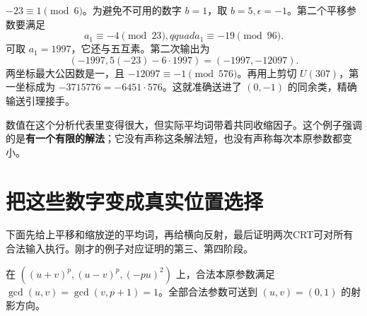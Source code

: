 $-23\equiv1\pmod6$。为避免不可用的数字 $b=1$，取 $b=5,\epsilon=-1$。第二个平移参数要满足
\[a_1\equiv-4\pmod{23},qquad a_1\equiv-19\pmod{96}.
\]
可取 $a_1=1997$，它还与五互素。第二次输出为
\[(-1997,5(-23)-6\cdot1997)=(-1997,-12097).
\]
两坐标最大公因数是一，且 $-12097\equiv-1\pmod{576}$。再用上剪切 $U(307)$，第一坐标成为 $-3715776=-6451\cdot576$。这就准确送进了 $(0,-1)$ 的同余类，精确输送引理接手。

数值在这个分析代表里变得很大，但实际平均词带着共同收缩因子。这个例子强调的是\textbf{有一个有限的解法}；它没有声称这条解法短，也没有声称每次本原参数都变小。

\section{把这些数字变成真实位置选择}
下面先给上平移和缩放逆的平均词，再给横向反射，最后证明两次CRT可对所有合法输入执行。刚才的例子对应证明的第三、第四阶段。
\begin{lemma}[两次CRT将尺度送到正负1]\label{lem:two-carrier}
在 $((u+v)^p,(u-v)^p,(-pu)^2)$ 上，合法本原参数满足 $\gcd(u,v)=\gcd(v,p+1)=1$。全部合法参数可送到 $(u,v)=(0,1)$ 的射影方向。
\end{lemma}
